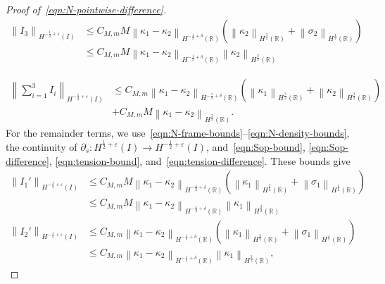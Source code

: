 \documentclass[11pt,reqno]{amsart}
\theoremstyle{plain}
\theoremstyle{definition}
\numberwithin{equation}{section}
\newcommand{\paren}[1]{\left(#1\right)}
\newcommand{\p}{\partial}
\newcommand{\norm}[1]{\left\lVert #1 \right\rVert}
\newcommand{\R}{\mathbb{R}}
\newcommand{\hi}[1]{H^{#1}(I)}
\newcommand{\hr}[1]{H^{#1}(\R)}
\begin{document}
\begin{proof}[Proof of~\eqref{eqn:N-pointwise-difference}]
\begin{equation}
\begin{aligned}
    \norm{I_3}_{\hi{-\frac{1}{2}+\varepsilon}} &\le C_{M,m}M \norm{\kappa_1-\kappa_2}_{\hr{-\frac{1}{2}+\delta}} \paren{ \norm{\kappa_2}_{\hr{\frac{3}{2}}} +  \norm{\sigma_2}_{\hr{\frac{1}{2}}}  }  \\
    & \le C_{M,m}M \norm{\kappa_1-\kappa_2}_{\hr{-\frac{1}{2}+\delta}} \norm{\kappa_2}_{\hr{\frac{3}{2}}}
\end{aligned}
\end{equation}

\begin{equation}
\begin{aligned}
    \norm{\sum_{i=1}^3 I_i}_{\hi{-\frac{1}{2}+\varepsilon}} &\le C_{M,m} \norm{\kappa_1-\kappa_2}_{\hr{-\frac{1}{2}+\delta}} \paren{\norm{\kappa_1}_{\hr{\frac{3}{2}}}+\norm{\kappa_2}_{\hr{\frac{3}{2}}}} \\
    &+ C_{M,m}M \norm{\kappa_1-\kappa_2}_{\hr{\frac{3}{2}}}.
\end{aligned}
\end{equation}
For the remainder terms, we use~\eqref{eqn:N-frame-bounds}--\eqref{eqn:N-density-bounds}, the
continuity of
$\p_s:H^{\frac{1}{2}+\varepsilon}(I)\to
H^{-\frac{1}{2}+\varepsilon}(I)$, and~\eqref{eqn:Sop-bound}, \eqref{eqn:Sop-difference}, \eqref{eqn:tension-bound}, and~\eqref{eqn:tension-difference}. These bounds give
\begin{equation}
\begin{aligned}
    \norm{I_1'}_{\hi{-\frac{1}{2}+\varepsilon}} &\le C_{M,m}M \norm{\kappa_1-\kappa_2}_{\hr{-\frac{1}{2}+\delta}} \paren{ \norm{\kappa_1}_{\hr{\frac{3}{2}}} + \norm{\sigma_1}_{\hr{\frac{1}{2}}} } \\
    &\le C_{M,m}M \norm{\kappa_1-\kappa_2}_{\hr{-\frac{1}{2}+\delta}}  \norm{\kappa_1}_{\hr{\frac{3}{2}}}
\end{aligned}
\end{equation}
\begin{equation}
\begin{aligned}
    \norm{I_2'}_{\hi{-\frac{1}{2}+\varepsilon}} &\le C_{M,m} \norm{\kappa_1-\kappa_2}_{\hr{-\frac{1}{2}+\delta}}  \paren{ \norm{\kappa_1}_{\hr{\frac{3}{2}}} + \norm{\sigma_1}_{\hr{\frac{1}{2}}} } \\
    &\le C_{M,m} \norm{\kappa_1-\kappa_2}_{\hr{-\frac{1}{2}+\delta}} \norm{\kappa_1}_{\hr{\frac{3}{2}}},
\end{aligned}
\end{equation}
\begin{equation}

\end{equation}
\end{proof}
\end{document}
